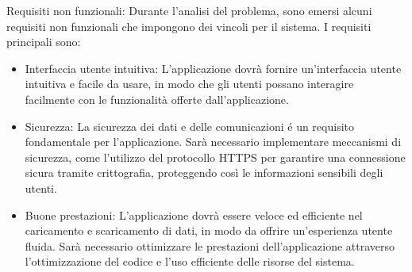 Requisiti non funzionali:\newline 
Durante l'analisi del problema, sono emersi alcuni requisiti non funzionali che impongono dei vincoli per il sistema. I requisiti principali sono:\newline

\begin{itemize}
	\item Interfaccia utente intuitiva: L'applicazione dovrà fornire un'interfaccia utente intuitiva e facile da usare, in modo che gli utenti possano interagire facilmente con le funzionalità offerte dall'applicazione.
	\item Sicurezza: La sicurezza dei dati e delle comunicazioni é un requisito fondamentale per l'applicazione. Sarà necessario implementare meccanismi di sicurezza, come l'utilizzo del protocollo HTTPS per garantire una connessione sicura tramite crittografia, proteggendo così le informazioni sensibili degli utenti.
	\item
    Buone prestazioni: L'applicazione dovrà essere veloce ed efficiente nel caricamento e scaricamento di dati, in modo da offrire un'esperienza utente fluida. Sarà necessario ottimizzare le prestazioni dell'applicazione attraverso l'ottimizzazione del codice e l'uso efficiente delle risorse del sistema.
\end{itemize}